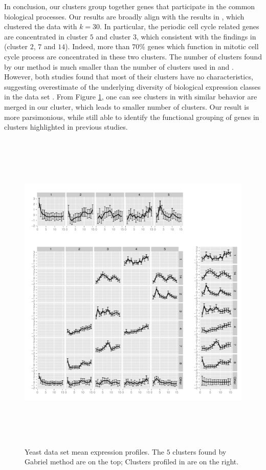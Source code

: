 \documentclass[12pt]{article}
\begin{document}
In conclusion, our clusters group together genes that participate in the common biological processes. Our results are broadly align with the results in \cite{tavazoie1999systematic}, which clustered the data with $k=30$. In particular, the periodic cell cycle related genes are concentrated in cluster $5$ and cluster $3$, which consistent with the findings in \cite{tavazoie1999systematic} (cluster $2$, $7$ and $14$). Indeed, more than $70\%$ genes which function in mitotic cell cycle process are concentrated in these two clusters. The number of clusters found by our method is much smaller than the number of clusters used in \cite{tavazoie1999systematic} and \cite{dortet2008model}. However, both studies found that most of their clusters have no characteristics, suggesting overestimate of the underlying diversity of biological expression classes in the data set \citep{tavazoie1999systematic}. From Figure \ref{fig:5_clusters}, one can see clusters in \cite{tavazoie1999systematic} with similar behavior are merged in our cluster, which leads to smaller number of clusters. Our result is more parsimonious, while still able to identify the functional grouping of genes in clusters highlighted in previous studies.


	\begin{figure}[H]
		\centering
	\includegraphics[width=6.2in, height=6.2in]{wei/split_plots.pdf}
	\caption{Yeast data set mean expression profiles. The $5$ clusters found by Gabriel method are on the top; Clusters profiled in \cite{tavazoie1999systematic} are on the right.}
	\label{fig:5_clusters}
	\end{figure}
\end{document}

